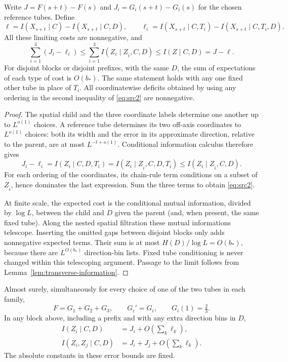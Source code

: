 \begin{lemma}
\label{lem:transverse-costs}
Write $J=F(s+t)-F(s)$ and $J_i=G_i(s+t)-G_i(s)$ for the chosen
reference tubes.  Define
\[
 \ell=I(X_{s+t}\mid C)-I(X_{s+t}\mid C,D),\qquad
 \ell_i=I(X_{s+t}\mid C,T_i)-I(X_{s+t}\mid C,T_i,D).
\]
All these limiting costs are nonnegative, and
\begin{equation}\label{eq:src2}
 \sum_{i=1}^3(J_i-\ell_i)
 \le\sum_{i=1}^3I(Z_i\mid Z_{\widehat i},C,D)
 \le I(Z\mid C,D)=J-\ell.
\end{equation}
For disjoint blocks or disjoint prefixes, with the same $D$, the
sum of expectations of each type of cost is $O(b_*)$.  The same
statement holds with any one fixed other tube in place of $T_i$.
All coordinatewise deficits obtained by using any ordering in the
second inequality of \eqref{eq:src2} are nonnegative.
\end{lemma}

\begin{proof}
The spatial child and the three coordinate labels determine one
another up to $L^{o(1)}$ choices.  A reference tube determines its
two off-axis coordinates to $L^{o(1)}$ choices: both its width and
the error in its approximate direction, relative to the parent,
are at most $L^{-t+o(1)}$.  Conditional information calculus therefore
gives
\[
 J_i-\ell_i=I(Z_i\mid C,D,T_i)
   =I(Z_i\mid Z_{\widehat i},C,D,T_i)
   \le I(Z_i\mid Z_{\widehat i},C,D).
\]
For each ordering of the coordinates, its chain-rule term conditions
on a subset of $Z_{\widehat i}$, hence dominates the last expression.
Sum the three terms to obtain \eqref{eq:src2}.

At finite scale, the expected cost is the conditional mutual
information, divided by $\log L$, between the child and $D$ given
the parent (and, when present, the same fixed tube).  Along the nested
spatial filtration these mutual informations telescope.  Inserting
the omitted gaps between disjoint blocks only adds nonnegative
expected terms.  Their sum is at most $H(D)/\log L=O(b_*)$, because
there are $L^{O(b_*)}$ direction-bin lists.  Fixed tube conditioning
is never changed within this telescoping argument.  Passage to the
limit follows from Lemma~\ref{lem:transverse-information}.
\end{proof}

\begin{lemma}
\label{lem:transverse-additivity}
Almost surely, simultaneously for every choice of one of the two
tubes in each family,
\[
 F=G_1+G_2+G_3,\qquad G_i'=G_i,\qquad G_i(1)=\tfrac23.
\]
In any block above, including a prefix and with any extra direction
bins in $D$,
\begin{equation}\label{eq:src3}
 \begin{split}
 I(Z_i\mid C,D)&=J_i+O\left(\sum_k\ell_k\right),\\
 I(Z_i,Z_j\mid C,D)&=J_i+J_j+
                       O\left(\sum_k\ell_k\right).
 \end{split}
\end{equation}
The absolute constants in these error bounds are fixed.
\end{lemma}

